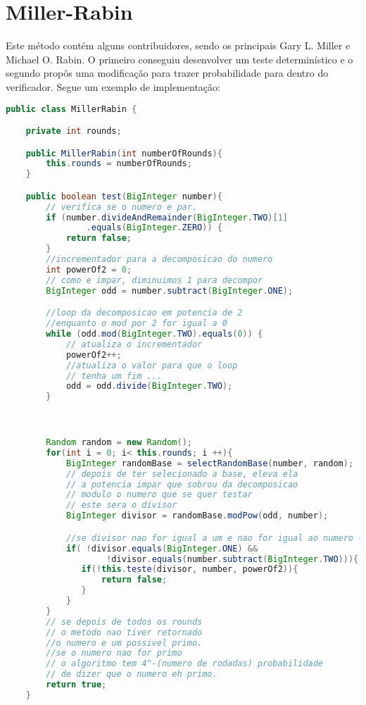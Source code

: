 \documentclass[openany]{ufsctex/ufsctex}
\begin{document}
\section{Miller-Rabin}
	Este método contém alguns contribuidores, sendo os principais Gary L. Miller e Michael O. Rabin. O primeiro conseguiu desenvolver um teste determinístico e o segundo propôs uma modificação para trazer probabilidade para dentro do verificador. Segue um exemplo de implementação: 
	 \begin{lstlisting}[language=Java,breaklines=true, tabsize=2,basicstyle =\fontsize{9}{11}]
public class MillerRabin {

    private int rounds;

    public MillerRabin(int numberOfRounds){
        this.rounds = numberOfRounds;
    }

    public boolean test(BigInteger number){
        // verifica se o numero e par.
        if (number.divideAndRemainder(BigInteger.TWO)[1]
                .equals(BigInteger.ZERO)) {
            return false;
        }
        //incrementador para a decomposicao do numero
        int powerOf2 = 0;
        // como e impar, diminuimos 1 para decompor
        BigInteger odd = number.subtract(BigInteger.ONE);

        //loop da decomposicao em potencia de 2
        //enquanto o mod por 2 for igual a 0
        while (odd.mod(BigInteger.TWO).equals(0)) {
            // atualiza o incrementador
            powerOf2++;
            //atualiza o valor para que o loop
            // tenha um fim ...
            odd = odd.divide(BigInteger.TWO);
        }



        Random random = new Random();
        for(int i = 0; i< this.rounds; i ++){
            BigInteger randomBase = selectRandomBase(number, random);
            // depois de ter selecionado a base, eleva ela
            // a potencia impar que sobrou da decomposicao
            // modulo o numero que se quer testar
            // este sera o divisor
            BigInteger divisor = randomBase.modPow(odd, number);

            //se divisor nao for igual a um e nao for igual ao numero - 2
            if( !divisor.equals(BigInteger.ONE) &&
                    !divisor.equals(number.subtract(BigInteger.TWO))){
               if(!this.teste(divisor, number, powerOf2)){
                   return false;
               }
            }
        }
        // se depois de todos os rounds
        // o metodo nao tiver retornado
        //o numero e um possivel primo.
        //se o numero nao for primo
        // o algoritmo tem 4^-(numero de rodadas) probabilidade
        // de dizer que o numero eh primo.
        return true;
    }


\end{lstlisting}
\end{document}
